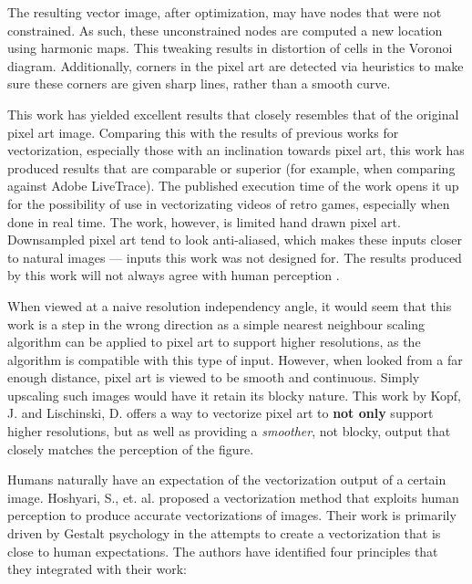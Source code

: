 The resulting vector image, after optimization, may have nodes that were not constrained. As such, these unconstrained nodes are computed a new location using harmonic maps. This tweaking results in distortion of cells in the Voronoi diagram. Additionally, corners in the pixel art are detected via heuristics to make sure these corners are given sharp lines, rather than a smooth curve.

This work has yielded excellent results that closely resembles that of the original pixel art image. Comparing this with the results of previous works for vectorization, especially those with an inclination towards pixel art, this work has produced results that are comparable or superior (for example, when comparing against Adobe LiveTrace). The published execution time of the work opens it up for the possibility of use in vectorizating videos of retro games, especially when done in real time. The work, however, is limited hand drawn pixel art. Downsampled pixel art tend to look anti-aliased, which makes these inputs closer to natural images --- inputs this work was not designed for. The results produced by this work will not always agree with human perception \cite{depixelizingpixelart}.

When viewed at a naive resolution independency angle, it would seem that this work is a step in the wrong direction as a simple nearest neighbour scaling algorithm can be applied to pixel art to support higher resolutions, as the algorithm is compatible with this type of input. However, when looked from a far enough distance, pixel art is viewed to be smooth and continuous. Simply upscaling such images would have it retain its blocky nature. This work by Kopf, J. and Lischinski, D. offers a way to vectorize pixel art to \textbf{not only} support higher resolutions, but as well as providing a \textit{smoother}, not blocky, output that closely matches the perception of the figure.

Humans naturally have an expectation of the vectorization output of a certain image. Hoshyari, S., et. al. proposed a vectorization method that exploits human perception to produce accurate vectorizations of images. Their work is primarily driven by Gestalt psychology in the attempts to create a vectorization that is close to human expectations. The authors have identified four principles that they integrated with their work:

